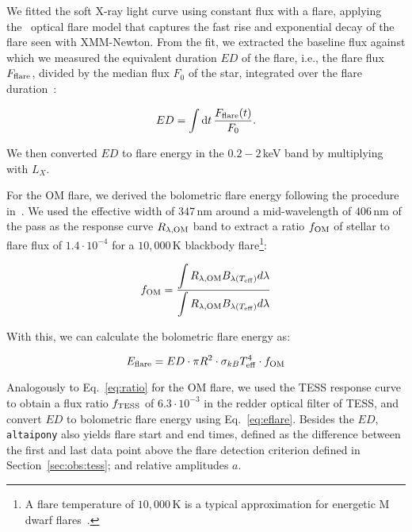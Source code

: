 \documentclass[twocolumn]{aastex631}
\begin{document}
We fitted the soft X-ray light curve using constant flux with a flare, applying the~\citet{davenport2014kepler} optical flare model that captures the fast rise and exponential decay of the flare seen with XMM-Newton. From the fit, we extracted the baseline flux against which we measured the equivalent duration $ED$ of the flare, i.e., the flare flux $F_{\rm flare}$, divided by the median flux $F_0$ of the star, integrated over the flare duration~\citep{gershberg1972results}:

\begin{equation}
\label{eq:ED}
ED=\displaystyle \int \mathrm dt\, \frac{F_{\rm flare}(t)}{F_0}.
\end{equation}

We then converted $ED$ to flare energy in the $0.2-2\,$keV band by multiplying with $L_X$. 

For the OM flare, we derived the bolometric flare energy following the procedure in~\citet{shibayama2013superflares}. We used the effective width of $347\,$nm around a mid-wavelength of $406\,$nm of the pass as the response curve $R_{\lambda, \rm OM}$ band to extract a ratio $f_{\rm OM}$ of stellar to flare flux of $1.4\cdot 10^{-4}$ for a $10,000\,$K blackbody flare\footnote{A flare temperature of $10,000\,$K is a typical approximation for energetic M dwarf flares~\citep{kowalski2013timeresolved, howard2020evryflarea}.}:

\begin{equation}
    f_{\rm OM} = \frac{\displaystyle\int R_{\lambda, \rm OM} B_{\lambda(T_{\rm eff})}  d\lambda}{\displaystyle\int R_{\lambda, \rm OM} B_{\lambda(T_{\rm eff})} d\lambda} 
    \label{eq:ratio}
\end{equation}

With this, we can calculate the bolometric flare energy as:

\begin{equation}
    E_{\rm flare} = ED \cdot \pi R^2 \cdot \sigma_{kB} T_{\rm eff}^4 \cdot f_{\rm OM}
    \label{eq:eflare}
\end{equation}


Analogously to Eq.~\ref{eq:ratio} for the OM flare, we used the TESS response curve to obtain a flux ratio $f_{\rm TESS}$ of $6.3\cdot10^{-3}$ in the redder optical filter of TESS, and convert $ED$ to bolometric flare energy using Eq.~\ref{eq:eflare}. Besides the $ED$, \texttt{altaipony} also yields flare start and end times, defined as the difference between the first and last data point above the flare detection criterion defined in Section~\ref{sec:obs:tess}; and relative amplitudes $a$.
\end{document}
